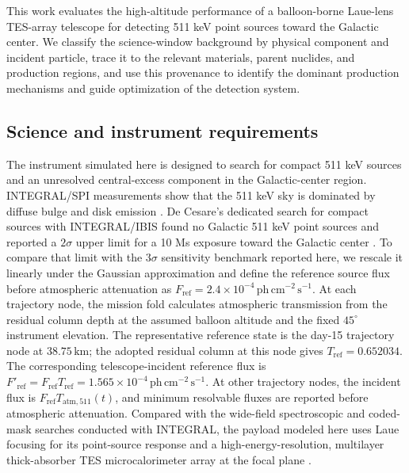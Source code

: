 \documentclass[11pt]{article}
\newcommand{\phcms}{\ensuremath{\,\mathrm{ph\,cm^{-2}\,s^{-1}}}}
\newcommand{\fref}{F_{\mathrm{ref}}}
\begin{document}
This work evaluates the high-altitude performance of a balloon-borne Laue-lens
TES-array telescope for detecting 511 keV point sources toward the Galactic
center. We classify the science-window background by physical component and
incident particle, trace it to the relevant materials, parent nuclides, and
production regions, and use this provenance to identify the dominant production
mechanisms and guide optimization of the detection system.

\subsection{Science and instrument requirements}
\label{sec:requirements}

\begingroup
{}

The instrument simulated here is designed to search for compact 511 keV sources
and an unresolved central-excess component in the Galactic-center region.
INTEGRAL/SPI measurements show that the 511 keV sky is dominated by diffuse
bulge and disk emission \cite{Siegert2016AA,Yoneda2025}. De Cesare's dedicated
search for compact sources with INTEGRAL/IBIS found no Galactic 511 keV point
sources and reported a $2\sigma$ upper limit for a 10 Ms exposure toward the
Galactic center \cite{DeCesare2011}. To compare that limit with the $3\sigma$
sensitivity benchmark reported here, we rescale it linearly under the Gaussian
approximation and define the reference source flux before atmospheric
attenuation as $\fref=2.4\times10^{-4}\phcms$. At each trajectory node, the
mission fold calculates atmospheric transmission from the residual column depth
at the assumed balloon altitude and the fixed $45^\circ$ instrument elevation.
The representative reference state is the day-15 trajectory node at
$38.75\,\mathrm{km}$; the adopted residual column at this node gives
$T_{\mathrm{ref}}=0.652034$. The corresponding telescope-incident reference
flux is $F'_{\mathrm{ref}}=\fref T_{\mathrm{ref}}=
1.565\times10^{-4}\phcms$. At other trajectory nodes, the incident flux is
$\fref T_{\mathrm{atm},511}(t)$, and minimum resolvable fluxes are reported
before atmospheric attenuation. Compared with the wide-field
spectroscopic and coded-mask searches conducted with INTEGRAL, the payload
modeled here uses Laue focusing for its point-source response and a
high-energy-resolution, multilayer thick-absorber TES microcalorimeter array at
the focal plane \cite{Shirazi2023,Caputo2017}.
\end{document}
